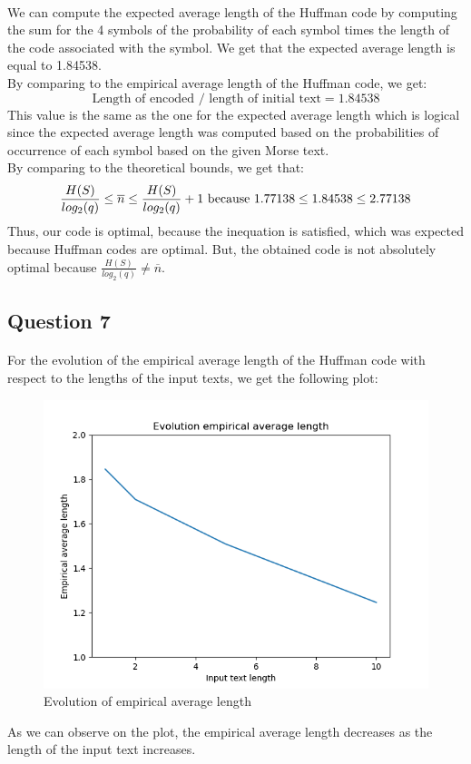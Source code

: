 \documentclass[a4paper, 11pt, oneside]{article}
\begin{document}
\paragraph{}We can compute the expected average length of the Huffman code by computing the sum for the 4 symbols of the probability of each symbol times the length of the code associated with the symbol.
We get that the expected average length is equal to 1.84538.\\
By comparing to the empirical average length of the Huffman code, we get:
$$\text{Length of encoded } / \text{ length of initial text} = 1.84538$$
This value is the same as the one for the expected average length which is logical since the expected average length was computed based on the probabilities of occurrence of each symbol based on the given Morse text.\\
By comparing to the theoretical bounds, we get that:\\
\begin{equation}
    \frac{H(S)}{log_2(q)} \leq \overline{n} \leq \frac{H(S)}{log_2(q)} + 1$ because $1.77138 \leq 1.84538 \leq 2.77138
\end{equation}
Thus, our code is optimal, because the inequation is satisfied, which was expected because Huffman codes are optimal. But, the obtained code is not absolutely optimal because $\frac{H(S)}{log_2(q)} \neq \overline{n}$.


\subsection{Question 7}
\paragraph{}For the evolution of the empirical average length of the Huffman code with respect to the lengths of the input texts, we get the following plot:
\begin{figure}[H]
    \centering
    \includegraphics[scale=0.5]{q7.png}
    \caption{Evolution of empirical average length}
\end{figure}
As we can observe on the plot, the empirical average length decreases as the length of the input text increases.
\end{document}
